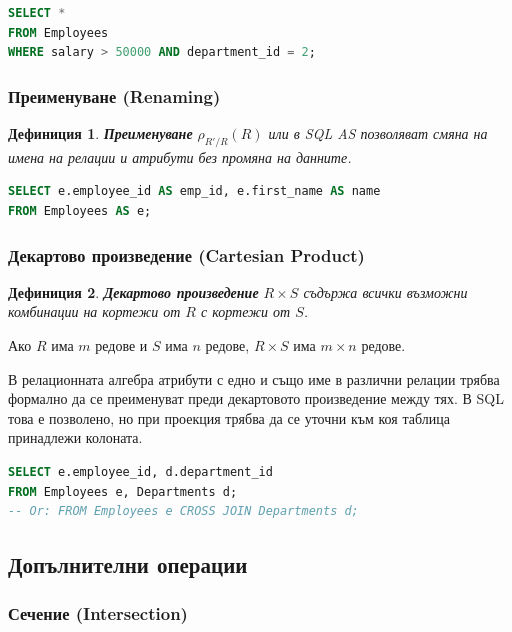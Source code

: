 \documentclass{scrartcl}
\newtheorem{definition}{Дефиниция}
\begin{document}
\begin{FlushLeft}
\begin{lstlisting}[language=SQL, caption=Selection (WHERE)]
SELECT *
FROM Employees
WHERE salary > 50000 AND department_id = 2;
\end{lstlisting}

\subsubsection{Преименуване (Renaming)}

\begin{definition}
\textbf{\textit{Преименуване}} $\rho_{R'/R}(R)$ или в SQL AS позволяват смяна на имена на релации и атрибути без промяна на данните.
\end{definition}

\begin{lstlisting}[language=SQL, caption=Renaming]
SELECT e.employee_id AS emp_id, e.first_name AS name
FROM Employees AS e;
\end{lstlisting}

\subsubsection{Декартово произведение (Cartesian Product)}

\begin{definition}
\textbf{\textit{Декартово произведение}} $R \times S$ съдържа всички възможни комбинации на кортежи от $R$ с кортежи от $S$.
\end{definition}

Ако $R$ има $m$ редове и $S$ има $n$ редове, $R \times S$ има $m \times n$ редове.

В релационната алгебра атрибути с едно и също име в различни релации трябва формално да се преименуват преди декартовото произведение между тях. В SQL това е позволено, но при проекция трябва да се уточни към коя таблица принадлежи колоната.

\begin{lstlisting}[language=SQL, caption=Cartesian product]
SELECT e.employee_id, d.department_id
FROM Employees e, Departments d;
-- Or: FROM Employees e CROSS JOIN Departments d;
\end{lstlisting}

\subsection{Допълнителни операции}

\subsubsection{Сечение (Intersection)}


\end{FlushLeft}
\end{document}
